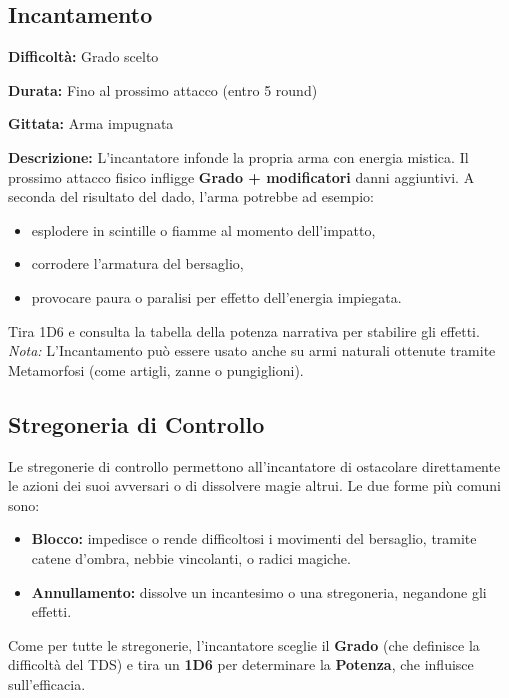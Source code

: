 \documentclass[./magie.tex]{subfiles}
\begin{document}
\subsection*{Incantamento}
\begin{description}
\item \textbf{Difficoltà:} Grado scelto
\item \textbf{Durata:} Fino al prossimo attacco (entro 5 round)
\item \textbf{Gittata:} Arma impugnata
\item \textbf{Descrizione:} L’incantatore infonde la propria arma con energia mistica. Il prossimo attacco fisico infligge \textbf{Grado + modificatori} danni aggiuntivi. A seconda del risultato del dado, l’arma potrebbe ad esempio:
\begin{itemize}
  \item esplodere in scintille o fiamme al momento dell’impatto,
  \item corrodere l’armatura del bersaglio,
  \item provocare paura o paralisi per effetto dell’energia impiegata.
\end{itemize}
\end{description}

Tira 1D6 e consulta la tabella della potenza narrativa per stabilire gli effetti.\\
\textit{Nota:} L’Incantamento può essere usato anche su armi naturali ottenute tramite Metamorfosi (come artigli, zanne o pungiglioni).

\clearpage
\subsection{Stregoneria di Controllo}

Le stregonerie di controllo permettono all’incantatore di ostacolare direttamente le azioni dei suoi avversari o di dissolvere magie altrui. Le due forme più comuni sono:

\begin{itemize}
\item \textbf{Blocco:} impedisce o rende difficoltosi i movimenti del bersaglio, tramite catene d’ombra, nebbie vincolanti, o radici magiche.
\item \textbf{Annullamento:} dissolve un incantesimo o una stregoneria, negandone gli effetti.
\end{itemize}

Come per tutte le stregonerie, l’incantatore sceglie il \textbf{Grado} (che definisce la difficoltà del TDS) e tira un \textbf{1D6} per determinare la \textbf{Potenza}, che influisce sull’efficacia.
\end{document}
